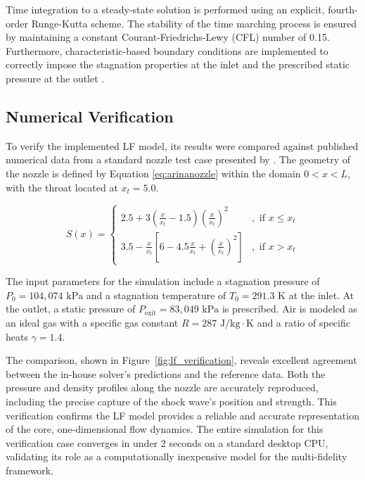 \documentclass[tg, EN]{ufabcFHZh_tg}
\begin{document}
Time integration to a steady-state solution is performed using an explicit, fourth-order Runge-Kutta scheme. The stability of the time marching process is ensured by maintaining a constant Courant-Friedrichs-Lewy (CFL) number of 0.15. Furthermore, characteristic-based boundary conditions are implemented to correctly impose the stagnation properties at the inlet and the prescribed static pressure at the outlet \citep{hirsch1988numerical, hirsch1990numerical}.

\subsection{Numerical Verification}

To verify the implemented LF model, its results were compared against published numerical data from a standard nozzle test case presented by \cite{arina2004}. The geometry of the nozzle is defined by Equation \ref{eq:arinanozzle} within the domain $0 < x < L$, with the throat located at $x_t = 5.0$.

\begin{equation}
S(x)= \begin{cases}
2.5+3\left(\frac{x}{x_t}-1.5\right)\left(\frac{x}{x_t}\right)^2 & , \text { if } x \leqslant x_t \\
3.5-\frac{x}{x_t}\left[6-4.5 \frac{x}{x_t}+\left(\frac{x}{x_t}\right)^2\right] & , \text { if } x>x_t
\end{cases}
\label{eq:arinanozzle}
\end{equation}

The input parameters for the simulation include a stagnation pressure of $P_0 = 104,074 \text{ kPa}$ and a stagnation temperature of $T_0 = 291.3 \text{ K}$ at the inlet. At the outlet, a static pressure of $P_{\text{exit}} = 83,049 \text{ kPa}$ is prescribed. Air is modeled as an ideal gas with a specific gas constant $R = 287 \text{ J/kg}\cdot\text{K}$ and a ratio of specific heats $\gamma = 1.4$.

The comparison, shown in Figure~\ref{fig:lf_verification}, reveals excellent agreement between the in-house solver's predictions and the reference data. Both the pressure and density profiles along the nozzle are accurately reproduced, including the precise capture of the shock wave's position and strength. This verification confirms the LF model provides a reliable and accurate representation of the core, one-dimensional flow dynamics. The entire simulation for this verification case converges in under 2 seconds on a standard desktop CPU, validating its role as a computationally inexpensive model for the multi-fidelity framework.
\end{document}
